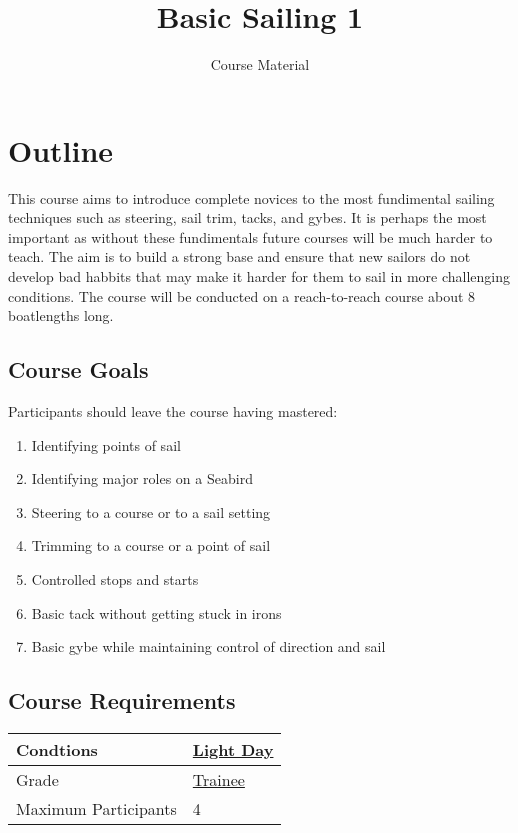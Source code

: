 \documentclass[12pt]{scrartcl}
\title{Basic Sailing 1}
\subtitle{Course Material}
\date{}
\begin{document}
\maketitle

\thispagestyle{empty}

\tableofcontents

\newpage

\section{Outline} \label{sec:outline}

This course aims to introduce complete novices to the most fundimental sailing techniques such as steering, sail trim, tacks, and gybes. It is perhaps the most important as without these fundimentals future courses will be much harder to teach. The aim is to build a strong base and ensure that new sailors do not develop bad habbits that may make it harder for them to sail in more challenging conditions. The course will be conducted on a reach-to-reach course about 8 boatlengths long.

\subsection{Course Goals} \label{subsec:goals}

Participants should leave the course having mastered:

\label{list:goals}
\begin{enumerate}
	\item Identifying points of sail
	\item Identifying major roles on a Seabird
	\item Steering to a course or to a sail setting
	\item Trimming to a course or a point of sail
	\item Controlled stops and starts
	\item Basic tack without getting stuck in irons
	\item Basic gybe while maintaining control of direction and sail
\end{enumerate}

\subsection{Course Requirements} \label{subsec:requirements}

\label{tab:requirements}
\begin{tabular}{|l|l|}
	\hline
	Condtions & \hyperlink{condition:light}{Light Day} \\
	\hline
	Grade & \hyperlink{grade:trainee}{Trainee} \\
	\hline
	Maximum Participants & 4 \\
	\hline
\end{tabular}
\end{document}
